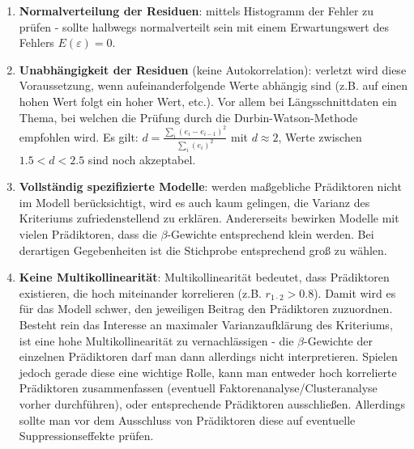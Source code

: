 \documentclass[]{article}
\begin{document}
\begin{enumerate}
\def\labelenumi{\arabic{enumi}.}
\setcounter{enumi}{2}
\item
  \textbf{Normalverteilung der Residuen}: mittels Histogramm der Fehler
  zu prüfen - sollte halbwegs normalverteilt sein mit einem
  Erwartungswert des Fehlers \(E(\varepsilon) = 0\).
\item
  \textbf{Unabhängigkeit der Residuen} (keine Autokorrelation): verletzt
  wird diese Voraussetzung, wenn aufeinanderfolgende Werte abhängig sind
  (z.B. auf einen hohen Wert folgt ein hoher Wert, etc.). Vor allem bei
  Längsschnittdaten ein Thema, bei welchen die Prüfung durch die
  Durbin-Watson-Methode empfohlen wird. Es gilt:
  \(d = \frac{\sum_{i} (e_i - e_{i-1})^2}{\sum_{i} (e_i)^2}\) mit
  \(d \approx 2\), Werte zwischen \(1.5 < d < 2.5\) sind noch
  akzeptabel.
\item
  \textbf{Vollständig spezifizierte Modelle}: werden maßgebliche
  Prädiktoren nicht im Modell berücksichtigt, wird es auch kaum
  gelingen, die Varianz des Kriteriums zufriedenstellend zu erklären.
  Andererseits bewirken Modelle mit vielen Prädiktoren, dass die
  \(\beta\)-Gewichte entsprechend klein werden. Bei derartigen
  Gegebenheiten ist die Stichprobe entsprechend groß zu wählen.
\item
  \textbf{Keine Multikollinearität}: Multikollinearität bedeutet, dass
  Prädiktoren existieren, die hoch miteinander korrelieren (z.B.
  \(r_{1\cdot2} > 0.8\)). Damit wird es für das Modell schwer, den
  jeweiligen Beitrag den Prädiktoren zuzuordnen. Besteht rein das
  Interesse an maximaler Varianzaufklärung des Kriteriums, ist eine hohe
  Multikollinearität zu vernachlässigen - die \(\beta\)-Gewichte der
  einzelnen Prädiktoren darf man dann allerdings nicht interpretieren.
  Spielen jedoch gerade diese eine wichtige Rolle, kann man entweder
  hoch korrelierte Prädiktoren zusammenfassen (eventuell
  Faktorenanalyse/Clusteranalyse vorher durchführen), oder entsprechende
  Prädiktoren ausschließen. Allerdings sollte man vor dem Ausschluss von
  Prädiktoren diese auf eventuelle Suppressionseffekte prüfen.


\end{enumerate}
\end{document}
